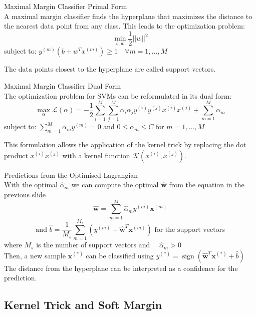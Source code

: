 \begin{definition}{Maximal Margin Classifier} Primal Form\\
    A maximal margin classifier finds the hyperplane that maximizes the distance to the nearest data point from any class. This leads to the optimization problem:
    \[\min_{b,w} \frac{1}{2}||w||^2\]
    subject to: $y^{(m)}(b + w^T x^{(m)}) \geq 1 \quad \forall m = 1,..., M$

    The data points closest to the hyperplane are called support vectors.
\end{definition}

\begin{concept}{Maximal Margin Classifier} Dual Form\\
The optimization problem for SVMs can be reformulated in its dual form:
\[\max_{\alpha} \mathcal{L}(\alpha) = - \frac{1}{2}\sum_{i=1}^{M}\sum_{j=1}^{M}\alpha_i\alpha_j y^{(i)}y^{(j)}x^{(i)}x^{(j)} + \sum_{m=1}^{M}\alpha_m\]
subject to: $\sum_{m=1}^{M}\alpha_m y^{(m)} = 0$ and $0 \leq \alpha_m \leq C$ for $m = 1, ..., M$

This formulation allows the application of the kernel trick by replacing the dot product $x^{(i)}x^{(j)}$ with a kernel function $\mathcal{K}(x^{(i)}, x^{(j)})$.
\end{concept}

\begin{theorem}{Predictions from the Optimised Lagrangian}\\
    With the optimal $\hat{\alpha}_m$ we can compute the optimal $\widehat{\mathbf{w}}$ from the equation in the previous slide
    \[ \widehat{\mathbf{w}}=\sum_{m=1}^M \hat{\alpha}_m y^{(m)} \mathbf{x}^{(m)} \]
    \[ \text{and }\hat{b}=\frac{1}{M_s} \sum_{m=1}^{M_s}\left(y^{(m)}-\widehat{\mathbf{w}}^T \mathbf{x}^{(m)}\right) \text{ for the support vectors}\]
    where $M_s$ is the number of support vectors and $\quad \hat{\alpha}_m>0$
    \vspace{2mm}\\
    Then, a new sample $\mathbf{x}^{(*)}$ can be classified using $y^{(*)}=\operatorname{sign}(\widehat{\mathbf{w}}^T \mathbf{x}^{(*)}+\hat{b})$
    The distance from the hyperplane can be interpreted as a confidence for the prediction.
\end{theorem}

\raggedcolumns
\columnbreak

\subsection{Kernel Trick and Soft Margin}

